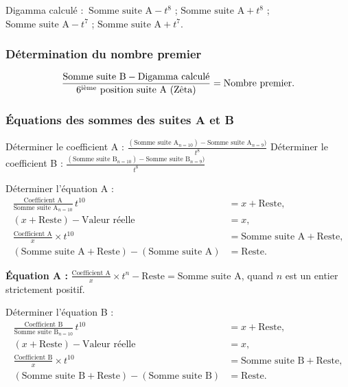 \documentclass[11pt,a4paper]{article}
\begin{document}
Digamma calculé : $\ \text{Somme suite A} - t^{8}$ ;\quad
$\text{Somme suite A} + t^{8}$ ;\quad
$\text{Somme suite A} - t^{7}$ ;\quad
$\text{Somme suite A} + t^{7}$.

\subsubsection{Détermination du nombre premier}
\begin{boiteformule}
\[
\frac{\text{Somme suite B} - \text{Digamma calculé}}{6\textsuperscript{ième}\ \text{position suite A}\ (\text{Zêta})}
= \text{Nombre premier}.
\]
\end{boiteformule}

\subsubsection{Équations des sommes des suites A et B}

Déterminer le coefficient A :
$\displaystyle \frac{(\text{Somme suite A}_{n=10}) - \text{Somme suite A}_{n=9})}{t^{8}}$ \quad
Déterminer le coefficient B :
$\displaystyle \frac{(\text{Somme suite B}_{n=10}) - \text{Somme suite B}_{n=9})}{t^{8}}$

Déterminer l'équation A :
\begin{align*}
\frac{\text{Coefficient A}}{\text{Somme suite A}_{n=10}}\,t^{10}
&=x+\text{Reste},\\
(x+\text{Reste})-\text{Valeur réelle}&=x,\\
\frac{\text{Coefficient A}}{x}\times t^{10}
&=\text{Somme suite A}+\text{Reste},\\
(\text{Somme suite A}+\text{Reste})-(\text{Somme suite A})
&=\text{Reste}.
\end{align*}

\textbf{Équation A :} $\displaystyle \frac{\text{Coefficient A}}{x} \times t^{n} - \text{Reste} = \text{Somme suite A}$,
quand $n$ est un entier strictement positif.

Déterminer l'équation B :
\begin{align*}
\frac{\text{Coefficient B}}{\text{Somme suite B}_{n=10}}\,t^{10}
&=x+\text{Reste},\\
(x+\text{Reste})-\text{Valeur réelle}&=x,\\
\frac{\text{Coefficient B}}{x}\times t^{10}
&=\text{Somme suite B}+\text{Reste},\\
(\text{Somme suite B}+\text{Reste})-(\text{Somme suite B})
&=\text{Reste}.
\end{align*}
\end{document}

